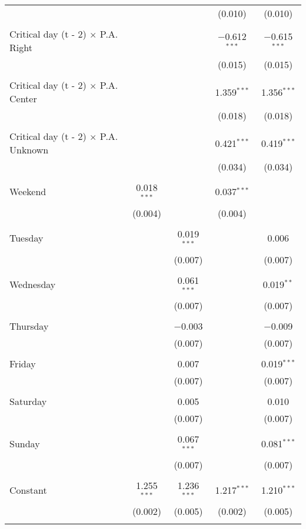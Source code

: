 \documentclass[
]{article}
\begin{document}
\begin{table}[!htbp]
{\begin{tabular}{@{\extracolsep{5pt}}lcccc}
  &  &  & (0.010) & (0.010) \\ 
  & & & & \\ 
 Critical day (t - 2) $\times$ P.A. Right &  &  & $-$0.612$^{***}$ & $-$0.615$^{***}$ \\ 
  &  &  & (0.015) & (0.015) \\ 
  & & & & \\ 
 Critical day (t - 2) $\times$ P.A. Center &  &  & 1.359$^{***}$ & 1.356$^{***}$ \\ 
  &  &  & (0.018) & (0.018) \\ 
  & & & & \\ 
 Critical day (t - 2) $\times$ P.A. Unknown &  &  & 0.421$^{***}$ & 0.419$^{***}$ \\ 
  &  &  & (0.034) & (0.034) \\ 
  & & & & \\ 
 Weekend & 0.018$^{***}$ &  & 0.037$^{***}$ &  \\ 
  & (0.004) &  & (0.004) &  \\ 
  & & & & \\ 
 Tuesday &  & 0.019$^{***}$ &  & 0.006 \\ 
  &  & (0.007) &  & (0.007) \\ 
  & & & & \\ 
 Wednesday &  & 0.061$^{***}$ &  & 0.019$^{**}$ \\ 
  &  & (0.007) &  & (0.007) \\ 
  & & & & \\ 
 Thursday &  & $-$0.003 &  & $-$0.009 \\ 
  &  & (0.007) &  & (0.007) \\ 
  & & & & \\ 
 Friday &  & 0.007 &  & 0.019$^{***}$ \\ 
  &  & (0.007) &  & (0.007) \\ 
  & & & & \\ 
 Saturday &  & 0.005 &  & 0.010 \\ 
  &  & (0.007) &  & (0.007) \\ 
  & & & & \\ 
 Sunday &  & 0.067$^{***}$ &  & 0.081$^{***}$ \\ 
  &  & (0.007) &  & (0.007) \\ 
  & & & & \\ 
 Constant & 1.255$^{***}$ & 1.236$^{***}$ & 1.217$^{***}$ & 1.210$^{***}$ \\ 
  & (0.002) & (0.005) & (0.002) & (0.005) \\ 
  & & & & \\ 

\end{tabular}}
\end{table}
\end{document}
